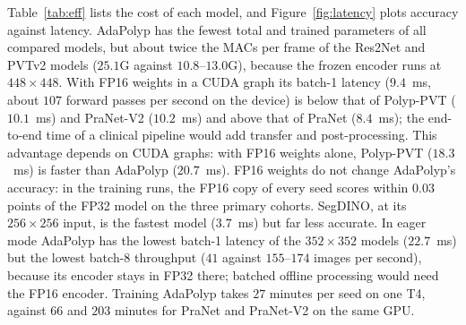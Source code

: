 \documentclass{ieeeaccess}
\begin{document}
Table~\ref{tab:eff} lists the cost of each model, and Figure~\ref{fig:latency} plots accuracy against latency. AdaPolyp has the fewest total and trained parameters of all compared models, but about twice the MACs per frame of the Res2Net and PVTv2 models ($25.1$G against $10.8$--$13.0$G), because the frozen encoder runs at $448\times448$. With FP16 weights in a CUDA graph its batch-1 latency ($9.4$~ms, about $107$ forward passes per second on the device) is below that of Polyp-PVT ($10.1$~ms) and PraNet-V2 ($10.2$~ms) and above that of PraNet ($8.4$~ms); the end-to-end time of a clinical pipeline would add transfer and post-processing. This advantage depends on CUDA graphs: with FP16 weights alone, Polyp-PVT ($18.3$~ms) is faster than AdaPolyp ($20.7$~ms). FP16 weights do not change AdaPolyp's accuracy: in the training runs, the FP16 copy of every seed scores within $0.03$ points of the FP32 model on the three primary cohorts. SegDINO, at its $256\times256$ input, is the fastest model ($3.7$~ms) but far less accurate. In eager mode AdaPolyp has the lowest batch-1 latency of the $352\times352$ models ($22.7$~ms) but the lowest batch-$8$ throughput ($41$ against $155$--$174$ images per second), because its encoder stays in FP32 there; batched offline processing would need the FP16 encoder. Training AdaPolyp takes $27$ minutes per seed on one T4, against $66$ and $203$ minutes for PraNet and PraNet-V2 on the same GPU.
\end{document}
